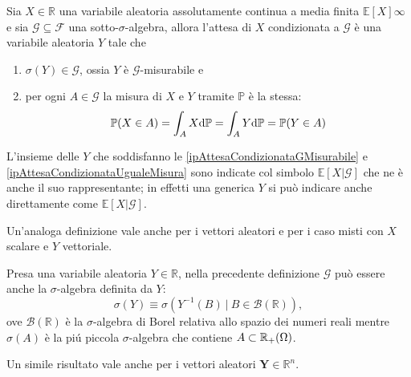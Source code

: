         \begin{dfn}
            Sia \(X\in\mathbb R\) una variabile aleatoria assolutamente continua a media finita \(\mathbb E[X]\infty\) e sia \(\mathcal G\subseteq\mathcal F\) una sotto-\(\sigma\)-algebra, allora l'attesa di \(X\) condizionata a \(\mathcal G\) è una variabile aleatoria \(Y\) tale che

            \begin{enumerate}[
                label=AC\arabic*,
                topsep=0.5em,
                parsep=0em,
                itemsep=0.25em,
                leftmargin=3em,
                rightmargin=1.5em,
            ]
                \item\label{ipAttesaCondizionataGMisurabile} \(\sigma(Y)\in\mathcal G\), ossia \(Y\) è \(\mathcal G\)-misurabile e
                \item\label{ipAttesaCondizionataUgualeMisura} per ogni \(A\in\mathcal G\) la misura di \(X\) e \(Y\) tramite \(\mathbb P\) è la stessa:
                    \[
                        \mathbb P(X\in A)=\int_AX\mathrm{d}\mathbb P=\int_AY\mathrm{d}\mathbb P=\mathbb P(Y\in A)
                    \]
            \end{enumerate}

            L'insieme delle \(Y\) che soddisfanno le \ref{ipAttesaCondizionataGMisurabile} e \ref{ipAttesaCondizionataUgualeMisura} sono indicate col simbolo \(\mathbb E[X|\mathcal G]\) che ne è anche il suo rappresentante; in effetti una generica \(Y\) si può indicare anche direttamente come \(\mathbb E[X|\mathcal G]\).

            Un'analoga definizione vale anche per i vettori aleatori e per i caso misti con \(X\) scalare e \(Y\) vettoriale.
        \end{dfn}

        \begin{oss}
            Presa una variabile aleatoria \(Y\in\mathbb R\), nella precedente definizione \(\mathcal G\) può essere anche la \(\sigma\)-algebra definita da \(Y\):
            \[
                \sigma(Y)\equiv\sigma({Y^{-1}(B)\ |\ B\in\mathcal B(\mathbb R)}),
            \]
            ove \(\mathcal B(\mathbb R)\) è la \(\sigma\)-algebra di Borel relativa allo spazio dei numeri reali mentre \(\sigma(A)\) è la piú piccola \(\sigma\)-algebra che contiene \(A\subset\mathbb R_+(\Omega)\).

            Un simile risultato vale anche per i vettori aleatori \(\mathbf Y\in\mathbb R^n\).
        \end{oss}

